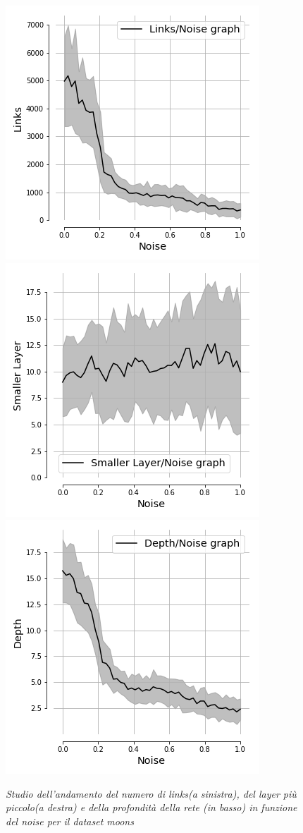 \documentclass[12pt,a4paper]{report}
\begin{document}
\begin{figure}[H]
 \centering
 \includegraphics[scale = 0.48]{images/links_noise_moons}
 \includegraphics[scale = 0.48]{images/small_noise_moons}
 \includegraphics[scale = 0.48]{images/depth_noise_moons}
 \caption{\textit{Studio dell'andamento del numero di links(a sinistra), del layer più piccolo(a destra) e della profondità della rete (in basso) in funzione del noise per il dataset moons}}
 \label{noisemoons}
\end{figure}
\end{document}
